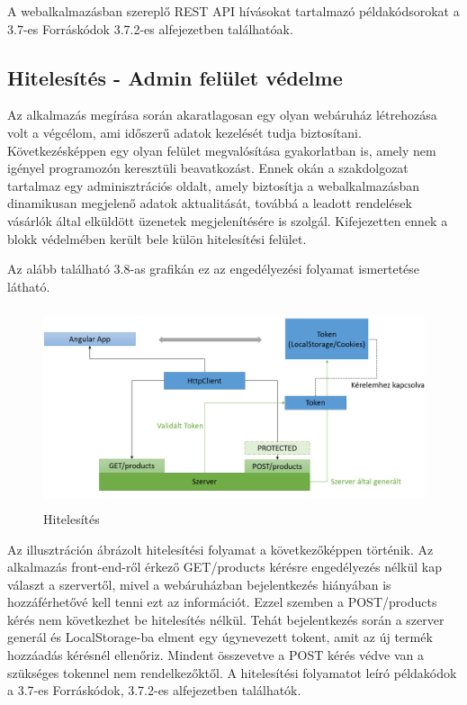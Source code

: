 A webalkalmazásban szereplő REST API hívásokat tartalmazó példakódsorokat a  3.7-es Forráskódok 3.7.2-es alfejezetben találhatóak.

\subsection{Hitelesítés - Admin felület védelme}
Az alkalmazás megírása során akaratlagosan egy olyan webáruház létrehozása volt a végcélom, ami időszerű adatok kezelését tudja biztosítani. Következésképpen egy olyan felület megvalósítása gyakorlatban is, amely nem igényel programozón keresztüli beavatkozást. Ennek okán a szakdolgozat tartalmaz egy adminisztrációs oldalt, amely biztosítja a webalkalmazásban dinamikusan megjelenő adatok aktualitását, továbbá a leadott rendelések vásárlók által elküldött üzenetek megjelenítésére is szolgál. Kifejezetten ennek a blokk védelmében került bele külön hitelesítési felület.

\bigskip
Az alább található 3.8-as grafikán ez az engedélyezési folyamat ismertetése látható.
 
\begin{figure}[H]
	\centering
	\includegraphics[width=1.0\textwidth,height=220px]{images/hitelesites_bemutatasa.png}
	\caption{Hitelesítés}
	\label{fig.picture-9}
\end{figure}

Az illusztráción ábrázolt hitelesítési folyamat a következőképpen történik. Az alkalmazás front-end-ről érkező GET/products kérésre engedélyezés nélkül kap választ a szervertől, mivel a webáruházban bejelentkezés hiányában is hozzáférhetővé kell tenni ezt az információt. Ezzel szemben a POST/products kérés nem következhet be hitelesítés nélkül. Tehát bejelentkezés során a szerver generál és LocalStorage-ba elment egy úgynevezett tokent, amit az új termék hozzáadás kérésnél ellenőriz. Mindent összevetve a POST kérés védve van a szükséges tokennel nem rendelkezőktől. A hitelesítési folyamatot leíró példakódok a 3.7-es Forráskódok, 3.7.2-es alfejezetben találhatók.

